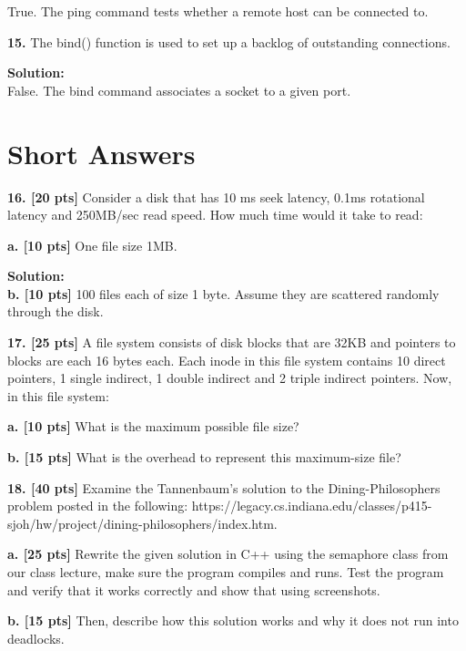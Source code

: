 \documentclass[12pt]{article}
\begin{document}
True. The ping command tests whether a remote host can be connected to. 

{\bf 15.} The bind() function is used to set up a backlog of outstanding connections. 

{\bf Solution:}\\

False. The bind command associates a socket to a given port. 

\section{Short Answers}

{\bf 16. [20 pts]} Consider a disk that has 10 ms seek latency, 0.1ms rotational latency and 250MB/sec read speed. How much time would it take to read:

{\bf a. [10 pts]} One file size 1MB. 

{\bf Solution:}\\



{\bf b. [10 pts]} 100 files each of size 1 byte. Assume they are scattered randomly through the disk. 

{\bf 17. [25 pts]} A file system consists of disk blocks that are 32KB and pointers to blocks are each 16 bytes each. Each inode in this file system contains 10 direct pointers, 1 single indirect, 1 double indirect and 2 triple indirect pointers. Now, in this file system:

{\bf a. [10 pts]} What is the maximum possible file size?

{\bf b. [15 pts]} What is the overhead to represent this maximum-size file?

{\bf 18. [40 pts]} Examine the  Tannenbaum’s solution to the Dining-Philosophers problem posted in the following: https://legacy.cs.indiana.edu/classes/p415-sjoh/hw/project/dining-philosophers/index.htm.

{\bf a. [25 pts]} Rewrite the given solution in C++ using the semaphore class from our class lecture, make sure the program compiles and runs. Test the program and verify that it works correctly and show that using screenshots.

{\bf b. [15 pts]} Then, describe how this solution works and why it does not run into deadlocks.
\end{document}
